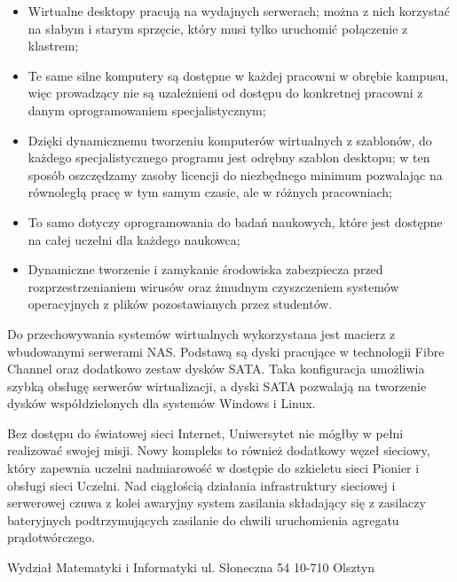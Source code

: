 \documentclass[a4paper,12pt]{article}
\begin{document}
\begin{itemize}
\item Wirtualne desktopy pracują na wydajnych serwerach; można z nich korzystać na słabym i starym sprzęcie, który musi tylko uruchomić połączenie z klastrem;
\item Te same silne komputery są dostępne w każdej pracowni w obrębie kampusu, więc prowadzący nie są uzależnieni od dostępu do konkretnej pracowni z danym oprogramowaniem specjalistycznym;
\item Dzięki dynamicznemu tworzeniu komputerów wirtualnych z szablonów, do każdego specjalistycznego programu jest odrębny szablon desktopu; w ten sposób oszczędzamy zasoby licencji do niezbędnego minimum pozwalając na równoległą pracę w tym samym czasie, ale w różnych pracowniach;
\item To samo dotyczy oprogramowania do badań naukowych, które jest dostępne na całej uczelni dla każdego naukowca;
\item Dynamiczne tworzenie i zamykanie środowiska zabezpiecza przed rozprzestrzenianiem wirusów oraz żmudnym czyszczeniem systemów operacyjnych z plików pozostawianych przez studentów.
\end{itemize}

Do przechowywania systemów wirtualnych wykorzystana jest macierz z wbudowanymi serwerami NAS. Podstawą są dyski pracujące w technologii  Fibre Channel oraz dodatkowo zestaw dysków SATA. Taka konfiguracja umożliwia szybką obsługę serwerów wirtualizacji, a dyski SATA pozwalają na tworzenie dysków współdzielonych dla systemów Windows i Linux.

Bez dostępu do światowej sieci Internet, Uniwersytet nie mógłby w pełni realizować swojej misji. Nowy kompleks to również dodatkowy węzeł sieciowy, który zapewnia uczelni nadmiarowość w dostępie do szkieletu sieci Pionier i obsługi sieci Uczelni. Nad ciągłością działania infrastruktury sieciowej i serwerowej czuwa z kolei awaryjny system zasilania składający się z zasilaczy bateryjnych podtrzymujących zasilanie do chwili uruchomienia agregatu prądotwórczego.


Wydział Matematyki i Informatyki
ul. Słoneczna 54
10-710 Olsztyn

\end{document}
